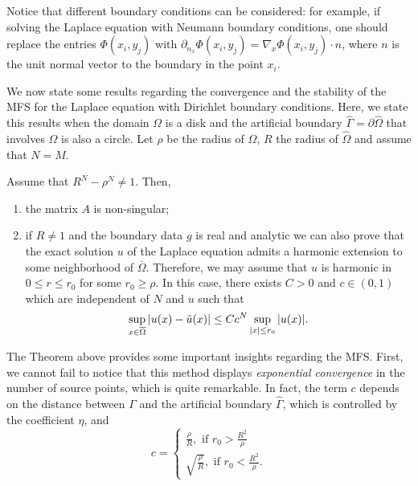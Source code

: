 Notice that different boundary conditions can be considered: for example, if solving the Laplace equation with Neumann boundary conditions, one should replace the entries \(\Phi(x_i,y_j)\) with \(\partial_{n_x}\Phi(x_i,y_j) = \nabla_x\Phi(x_i,y_j)\cdot n\), where \(n\) is the unit normal vector to the boundary in the point \(x_i\).

We now state some results regarding the convergence and the stability of the MFS for the Laplace equation with Dirichlet boundary conditions. Here, we state this results when the domain \(\Omega\) is a disk and the artificial boundary \(\hat{\Gamma} = \partial \hat{\Omega}\) that involves \(\Omega\) is also a circle. Let \(\rho\) be the radius of \(\Omega\), \(R\) the radius of \(\hat{\Omega}\) and assume that \(N=M\).
\begin{theorem}\label{mfs_lap_conv}
    Assume that \(R^N - \rho^N \neq 1\). Then,
    \begin{enumerate}
        \item the matrix \(A\) is non-singular;
        \item if \(R \neq 1\) and the boundary data \(g\) is real and analytic we can also prove that the exact solution \(u\) of the Laplace equation admits a harmonic extension to some neighborhood of \(\overline{\Omega}\). Therefore, we may assume that \(u\) is harmonic in \(0 \leq r \leq r_0\) for some \(r_0 \geq \rho\). In this case, there exists \(C > 0\) and \(c \in (0, 1)\) which are independent of \(N\) and \(u\) such that
        \[
            \sup_{\substack{x \in \overline{\Omega}}} \abs{u(x) - \tilde{u}(x)} \leq C c^N \sup_{\substack{\abs{x}\leq r_0}}\abs{u(x)}.
        \]
    \end{enumerate}
\end{theorem}
The Theorem above provides some important insights regarding the MFS. First, we cannot fail to notice that this method displays \textit{exponential convergence} in the number of source points, which is quite remarkable. In fact, the term \(c\) depends on the distance between \(\Gamma\) and the artificial boundary \(\hat{\Gamma}\), which is controlled by the coefficient \(\eta\), and
\[
    c = \begin{cases}
        \frac{\rho}{R}, \text{ if } r_0 > \frac{R^2}{\rho}\\
        \sqrt{\frac{\rho}{R}}, \text{ if } r_0 < \frac{R^2}{\rho}.
    \end{cases}
\]
